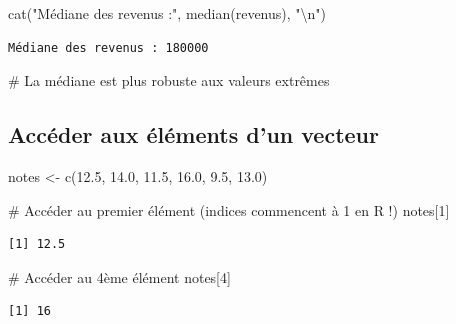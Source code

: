 \documentclass[
  french,
  11pt,
  a4paper,
]{article}
\newenvironment{Shaded}{}{}
\newcommand{\CommentTok}[1]{\textcolor[rgb]{0.42,0.45,0.49}{#1}}
\newcommand{\DecValTok}[1]{\textcolor[rgb]{0.00,0.36,0.77}{#1}}
\newcommand{\FloatTok}[1]{\textcolor[rgb]{0.00,0.36,0.77}{#1}}
\newcommand{\FunctionTok}[1]{\textcolor[rgb]{0.44,0.26,0.76}{#1}}
\newcommand{\NormalTok}[1]{\textcolor[rgb]{0.14,0.16,0.18}{#1}}
\newcommand{\OtherTok}[1]{\textcolor[rgb]{0.44,0.26,0.76}{#1}}
\newcommand{\SpecialCharTok}[1]{\textcolor[rgb]{0.00,0.36,0.77}{#1}}
\newcommand{\StringTok}[1]{\textcolor[rgb]{0.01,0.18,0.38}{#1}}
\begin{document}
\begin{Shaded}
\begin{Highlighting}[]
\FunctionTok{cat}\NormalTok{(}\StringTok{"Médiane des revenus :"}\NormalTok{, }\FunctionTok{median}\NormalTok{(revenus), }\StringTok{"}\SpecialCharTok{\textbackslash{}n}\StringTok{"}\NormalTok{)}
\end{Highlighting}
\end{Shaded}

\begin{verbatim}
Médiane des revenus : 180000 
\end{verbatim}

\begin{Shaded}
\begin{Highlighting}[]
\CommentTok{\# La médiane est plus robuste aux valeurs extrêmes}
\end{Highlighting}
\end{Shaded}

\subsection{Accéder aux éléments d'un
vecteur}\label{accuxe9der-aux-uxe9luxe9ments-dun-vecteur}

\begin{Shaded}
\begin{Highlighting}[]
\NormalTok{notes }\OtherTok{\textless{}{-}} \FunctionTok{c}\NormalTok{(}\FloatTok{12.5}\NormalTok{, }\FloatTok{14.0}\NormalTok{, }\FloatTok{11.5}\NormalTok{, }\FloatTok{16.0}\NormalTok{, }\FloatTok{9.5}\NormalTok{, }\FloatTok{13.0}\NormalTok{)}

\CommentTok{\# Accéder au premier élément (indices commencent à 1 en R !)}
\NormalTok{notes[}\DecValTok{1}\NormalTok{]}
\end{Highlighting}
\end{Shaded}

\begin{verbatim}
[1] 12.5
\end{verbatim}

\begin{Shaded}
\begin{Highlighting}[]
\CommentTok{\# Accéder au 4ème élément}
\NormalTok{notes[}\DecValTok{4}\NormalTok{]}
\end{Highlighting}
\end{Shaded}

\begin{verbatim}
[1] 16
\end{verbatim}
\end{document}

